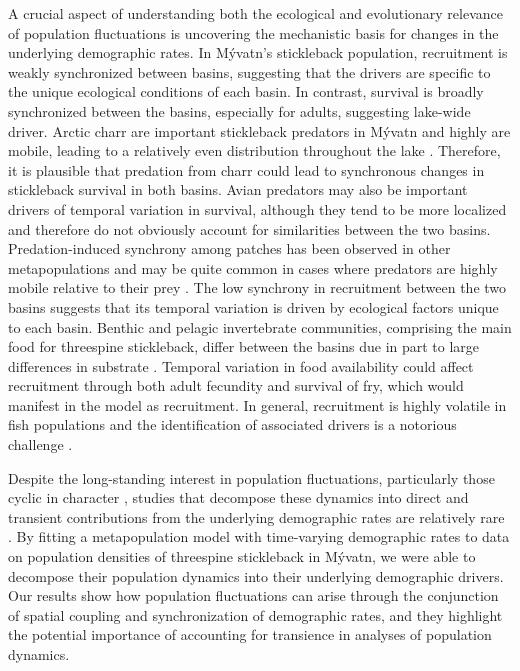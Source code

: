 \documentclass[11pt]{article}
\begin{document}
A crucial aspect of understanding both the ecological and evolutionary relevance of
population fluctuations is uncovering the mechanistic basis for changes in the underlying
demographic rates.
In M\'{y}vatn's stickleback population,
recruitment is weakly synchronized between basins,
suggesting that the drivers are specific to the unique ecological conditions of each basin.
In contrast, survival is broadly synchronized between the basins, especially for adults,
suggesting lake-wide driver.
Arctic charr are important stickleback predators in M\'{y}vatn and highly are mobile,
leading to a relatively even distribution throughout the lake
\citep[unpublished data;][]{gudbergsson2004}.
Therefore, it is plausible that predation from charr could lead to synchronous
changes in stickleback survival in both basins.
Avian predators may also be important drivers of temporal variation in survival,
although they tend to be more localized \citep{einarsson2004myvatn}
and therefore do not obviously
account for similarities between the two basins.
Predation-induced synchrony among patches has been observed in other metapopulations
and may be quite common in cases where predators are highly mobile relative to their prey
\citep{ims2000, gilg2009}.
The low synchrony in recruitment between the two basins suggests that
its temporal variation is driven by ecological factors unique to each basin.
Benthic and pelagic invertebrate communities,
comprising the main food for threespine stickleback,
differ between the basins due in part to large differences in substrate
\citep{bartrons2015spatial}.
Temporal variation in food availability could affect recruitment
through both adult fecundity and survival of fry,
which would manifest in the model as recruitment.
In general, recruitment is highly volatile in fish populations and
the identification of associated drivers is a notorious challenge
\citep{dixon1999episodic, ludsin2014physical}.

Despite the long-standing interest in population fluctuations,
particularly those cyclic in character
\citep{elton1924, nicholson1935},
studies that decompose these dynamics into direct and transient contributions
from the underlying demographic rates are relatively rare
\citep{fox2000population, koons2017understanding, hoy2020fluctuations}.
By fitting a metapopulation model with time-varying demographic rates to
data on population densities of threespine stickleback in M\'{y}vatn,
we were able to decompose their population dynamics into their
underlying demographic drivers.
Our results show how population fluctuations can arise through the conjunction of
spatial coupling and synchronization of demographic rates,
and they highlight the potential importance
of accounting for transience in analyses of population dynamics.
\end{document}
